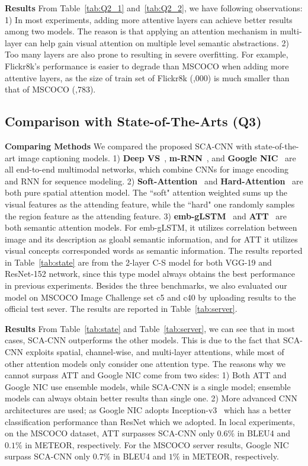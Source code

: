 \documentclass[10pt,twocolumn,letterpaper]{article}
\begin{document}
\textbf{Results} From Table~\ref{tab:Q2_1} and~\ref{tab:Q2_2}, we have following observations: 1) In most experiments, adding more attentive layers can
achieve better results among two models. The reason is that applying an attention mechanism in multi-layer can help gain visual attention on multiple level
semantic abstractions. 2) Too many layers are also prone to resulting in severe overfitting. For example, Flickr8k's performance is easier to degrade than
MSCOCO when adding more attentive layers, as the size of train set of Flickr8k (,000) is much smaller than that of MSCOCO (,783).

\subsection{Comparison with State-of-The-Arts (Q3)}\textbf{Comparing Methods} We compared the proposed SCA-CNN with state-of-the-art image captioning models. 1) \textbf{Deep VS}~\cite{karpathy2015deep},
\textbf{m-RNN}~\cite{mao2014deep}, and \textbf{Google NIC}~\cite{vinyals2015show} are all end-to-end multimodal networks, which combine CNNs for image
encoding and RNN for sequence modeling. 2) \textbf{Soft-Attention}~\cite{xu2015show} and \textbf{Hard-Attention}~\cite{xu2015show} are both pure spatial
attention model. The ``soft" attention weighted sums up the visual features as the attending feature, while the ``hard" one randomly samples the region
feature as the attending feature. 3) \textbf{emb-gLSTM}~\cite{jia2015guiding} and \textbf{ATT}~\cite{you2016image} are both semantic attention models. For
emb-gLSTM, it utilizes correlation between image and its description as gloabl semantic information, and for ATT it utilizes visual concepts corresponded
words as semantic information. The results reported in Table~\ref{tab:state} are from the 2-layer C-S model for both VGG-19 and ResNet-152 network, since this
type model always obtains the best performance in previous experiments. Besides the three benchmarks, we also evaluated our model on MSCOCO Image Challenge
set c5 and c40 by uploading results to the official test sever. The results are reported in Table~\ref{tab:server}.

\textbf{Results} From Table~\ref{tab:state} and Table~\ref{tab:server}, we can see that in most cases, SCA-CNN outperforms the other models. This is due to
the fact that SCA-CNN exploits spatial, channel-wise, and multi-layer attentions, while most of other attention models only consider one attention type. The
reasons why we cannot surpass ATT and Google NIC come from two sides: 1) Both ATT and Google NIC use ensemble models, while SCA-CNN is a single model;
ensemble models can always obtain better results than single one. 2) More advanced CNN architectures are used; as Google NIC adopts
Inception-v3~\cite{szegedy2016rethinking} which has a better classification performance than ResNet which we adopted. In local experiments, on the MSCOCO
dataset, ATT surpasses SCA-CNN only $0.6\%$ in BLEU4 and $0.1\%$ in METEOR, respectively. For the MSCOCO server results, Google NIC surpass SCA-CNN only
$0.7\%$ in BLEU4 and $1\%$ in METEOR, respectively.
\end{document}

